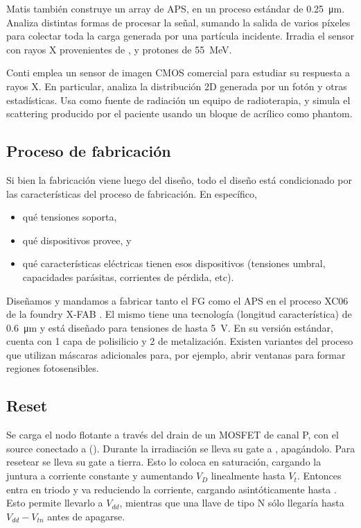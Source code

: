 Matis\cite{matis_charged_2003} también construye un array de APS,
en un proceso estándar de \SI{0.25}{\micro\meter}.
Analiza distintas formas de procesar la señal,
sumando la salida de varios píxeles para colectar toda la carga generada por
una partícula incidente.
Irradia el sensor con rayos X provenientes de ,
y protones de \SI{55}{\mega\electronvolt}.

Conti\cite{conti_use_2013} emplea un sensor de imagen CMOS comercial
para estudiar su respuesta a rayos X.
En particular, analiza la distribución 2D generada por un fotón
y otras estadísticas.
Usa como fuente de radiación un equipo de radioterapia,
y simula el scattering producido por el paciente usando un bloque de acrílico
como phantom.
%
\subsection{Proceso de fabricación}
Si bien la fabricación viene luego del diseño,
todo el diseño está condicionado por 
las características del proceso de fabricación.
En específico,
\begin{itemize}
    \item qué tensiones soporta,
    \item qué dispositivos provee, y
    \item qué características eléctricas tienen esos dispositivos
        (tensiones umbral, capacidades parásitas, corrientes de pérdida, etc).
\end{itemize}

Diseñamos y mandamos a fabricar tanto el FG como el APS 
en el proceso XC06 de la foundry X-FAB \cite{x-fab_0.6_2008}.
El mismo tiene una tecnología (longitud característica) 
de \SI{0.6}{\micro\meter} 
y está diseñado para tensiones de hasta \SI{5}{\volt}.
En su versión estándar, 
cuenta con 1 capa de polisilicio y 2 de metalización.
Existen variantes del proceso que utilizan máscaras adicionales para,
por ejemplo, abrir ventanas para formar regiones fotosensibles.
\subsection{Reset}
Se carga el nodo flotante a través del drain de un MOSFET de canal P,
con el source conectado a \vdd ().
Durante la irradiación se lleva su gate a \vdd, apagándolo.
Para resetear 
se lleva su gate a tierra.
Esto lo coloca en saturación,
cargando la juntura a corriente constante 
y aumentando $V_D$ linealmente hasta $V_t$.
Entonces entra en triodo y va reduciendo la corriente,
cargando asintóticamente hasta \vdd.
Esto permite llevarlo a $V_{dd}$,
mientras que una llave de tipo N sólo llegaría hasta $V_{dd}-V_{tn}$ antes de
apagarse.

